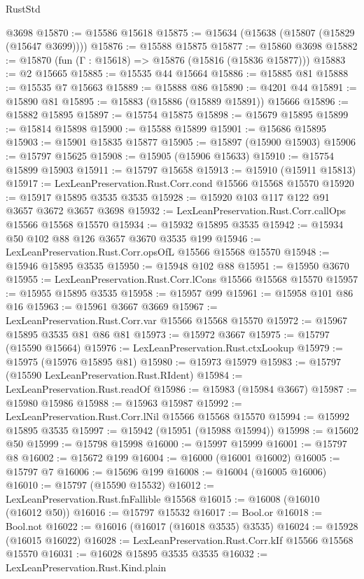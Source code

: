 \begin{lexlean}{RustStd}
\begin{coremodule}
    @3698
@15870 := @15586 @15618
@15875 := @15634 (@15638 (@15807 (@15829 (@15647 @3699))))
@15876 := @15588 @15875
@15877 := @15860 @3698
@15882 := @15870 (fun (Γ : @15618) => @15876 (@15816 (@15836 @15877)))
@15883 := @2 @15665
@15885 := @15535 @44 @15664
@15886 := @15885 @81
@15888 := @15535 @7 @15663
@15889 := @15888 @86
@15890 := @4201 @44
@15891 := @15890 @81
@15895 := @15883 (@15886 (@15889 @15891)) @15666
@15896 := @15882 @15895
@15897 := @15754 @15875
@15898 := @15679 @15895
@15899 := @15814 @15898
@15900 := @15588 @15899
@15901 := @15686 @15895
@15903 := @15901 @15835 @15877
@15905 := @15897 (@15900 @15903)
@15906 := @15797 @15625
@15908 := @15905 (@15906 @15633)
@15910 := @15754 @15899 @15903
@15911 := @15797 @15658
@15913 := @15910 (@15911 @15813)
@15917 := LexLeanPreservation.Rust.Corr.cond @15566 @15568 @15570
@15920 := @15917 @15895 @3535 @3535
@15928 := @15920 @103 @117 @122 @91 @3657 @3672 @3657 @3698
@15932 := LexLeanPreservation.Rust.Corr.callOps @15566 @15568 @15570
@15934 := @15932 @15895 @3535
@15942 := @15934 @50 @102 @88 @126 @3657 @3670 @3535 @199
@15946 := LexLeanPreservation.Rust.Corr.opsOfL @15566 @15568 @15570
@15948 := @15946 @15895 @3535
@15950 := @15948 @102 @88
@15951 := @15950 @3670
@15955 := LexLeanPreservation.Rust.Corr.lCons @15566 @15568 @15570
@15957 := @15955 @15895 @3535
@15958 := @15957 @99
@15961 := @15958 @101 @86 @16
@15963 := @15961 @3667 @3669
@15967 := LexLeanPreservation.Rust.Corr.var @15566 @15568 @15570
@15972 := @15967 @15895 @3535 @81 @86 @81
@15973 := @15972 @3667
@15975 := @15797 (@15590 @15664)
@15976 := LexLeanPreservation.Rust.ctxLookup
@15979 := @15975 (@15976 @15895 @81)
@15980 := @15973 @15979
@15983 := @15797 (@15590 LexLeanPreservation.Rust.RIdent)
@15984 := LexLeanPreservation.Rust.readOf
@15986 := @15983 (@15984 @3667)
@15987 := @15980 @15986
@15988 := @15963 @15987
@15992 := LexLeanPreservation.Rust.Corr.lNil @15566 @15568 @15570
@15994 := @15992 @15895 @3535
@15997 := @15942 (@15951 (@15988 @15994))
@15998 := @15602 @50
@15999 := @15798 @15998
@16000 := @15997 @15999
@16001 := @15797 @8
@16002 := @15672 @199
@16004 := @16000 (@16001 @16002)
@16005 := @15797 @7
@16006 := @15696 @199
@16008 := @16004 (@16005 @16006)
@16010 := @15797 (@15590 @15532)
@16012 := LexLeanPreservation.Rust.fnFallible @15568
@16015 := @16008 (@16010 (@16012 @50))
@16016 := @15797 @15532
@16017 := Bool.or
@16018 := Bool.not
@16022 := @16016 (@16017 (@16018 @3535) @3535)
@16024 := @15928 (@16015 @16022)
@16028 := LexLeanPreservation.Rust.Corr.kIf @15566 @15568 @15570
@16031 := @16028 @15895 @3535 @3535
@16032 := LexLeanPreservation.Rust.Kind.plain

\end{coremodule}
\end{lexlean}
